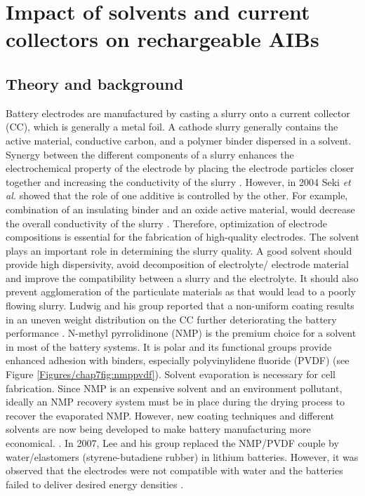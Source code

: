 \chapter{Impact of solvents and current collectors on rechargeable AIBs} %
\label{chap7} %

\section{Theory and background}

Battery electrodes are manufactured by casting a slurry onto a current collector (CC), which is generally a metal foil. A cathode slurry generally contains the active material, conductive carbon, and a polymer binder dispersed in a solvent. Synergy between the different components of a slurry enhances the electrochemical property of the electrode by placing the electrode particles closer together and increasing the conductivity of the slurry \cite{zheng_cooperation_2012}.
However, in 2004 Seki \textit{et al.} showed that the role of one additive is controlled by the other. For example, combination of an insulating binder and an oxide active material, would decrease the overall conductivity of the slurry \cite{guy_novel_2006, seki_effect_2004}. Therefore, optimization of electrode compositions is essential for the fabrication of high-quality electrodes. The solvent plays an important role in determining the slurry quality. A good solvent should provide high dispersivity, avoid decomposition of electrolyte/ electrode material and improve the compatibility between a slurry and the electrolyte. It should also prevent agglomeration of the particulate materials as that would lead to a poorly flowing slurry. Ludwig and his group reported that a non-uniform coating results in an uneven weight distribution on the CC further deteriorating the battery performance \cite{ludwig_solvent-free_2016}. N-methyl pyrrolidinone (NMP) is the premium choice for a solvent in most of the battery systems. It is polar and its functional groups provide enhanced adhesion with binders, especially polyvinylidene fluoride (PVDF) (see Figure \ref{Figures/chap7fig:nmppvdf}). Solvent evaporation is necessary for cell fabrication. Since NMP is an expensive solvent and an environment pollutant, ideally an NMP recovery system must be in place during the drying process to recover the evaporated NMP. However, new coating techniques and different solvents are now being developed to make battery manufacturing more economical. \cite{liu_effective_2014, spreafico_pvdf_2014, liu_effects_2008, lee_effect_2010, wenzel_challenges_2015, lee_selection_2017, stein_non-aqueous_2016}. In 2007, Lee and his group replaced the NMP/PVDF couple by water/elastomers (styrene-butadiene rubber) in lithium batteries. However, it was observed that the electrodes were not compatible with water and the batteries failed to deliver desired energy densities \cite{lee_novel_2007, li_effects_2005}. \\
